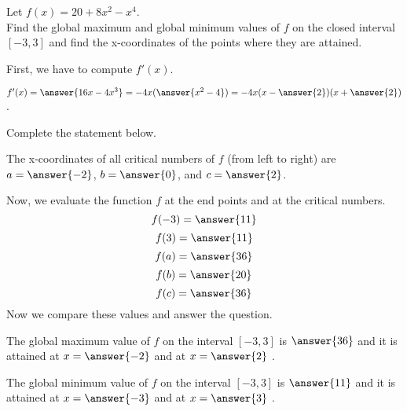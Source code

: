 \documentclass{ximera}
\begin{document}
\author{Nela Lakos}


\begin{exercise}

Let $f(x) = 20 + 8x^2 - x^4$.\\
 Find  the global maximum and global minimum values of $f$ on the closed interval $[-3,3]$ and find the x-coordinates of the points where they are attained.
\begin{hint}
 First, we have to compute $f'(x)$.

$f'(x) = \answer{16x-4x^3}=-4x(\answer{x^2-4})=-4x(x-\answer{2})(x+\answer{2})$.

Complete the statement below.

The  x-coordinates of all critical numbers of $f$ (from left to right) are $a=\answer{-2}$, $b=\answer{0}$, and $c=\answer{2}$.
\end{hint}
\begin{hint}
Now, we evaluate the function $f$ at the end points and at the critical numbers.
$$
f(-3) = \answer{11}
$$
$$
f(3) = \answer{11}
$$
$$
f(a) = \answer{36}
$$
$$
f(b) = \answer{20}
$$
$$
f(c) = \answer{36}
$$
Now we compare these values and answer the question.
\end{hint}
The global maximum value of $f$ on the interval $[-3,3]$ is $\answer{36}$ and it is attained at $x=\answer{-2}$ and at  $x=\answer{2}$  .

The global minimum value of $f$ on the interval $[-3,3]$ is $\answer{11}$ and it is attained  at $x=\answer{-3}$ and at $x=\answer{3}$ .

\end{exercise}
\end{document}

